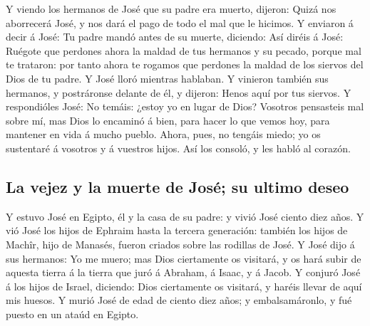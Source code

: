  Y viendo los hermanos de José que su padre era muerto,
dijeron: Quizá nos aborrecerá José, y nos dará el pago de todo el mal
que le hicimos.  Y enviaron á decir á José: Tu padre mandó
antes de su muerte, diciendo:  Así diréis á José: Ruégote
que perdones ahora la maldad de tus hermanos y su pecado, porque mal te
trataron: por tanto ahora te rogamos que perdones la maldad de los
siervos del Dios de tu padre. Y José lloró mientras hablaban.
 Y vinieron también sus hermanos, y postráronse delante de
él, y dijeron: Henos aquí por tus siervos.  Y respondióles
José: No temáis: ¿estoy yo en lugar de Dios?  Vosotros
pensasteis mal sobre mí, mas Dios lo encaminó á bien, para hacer lo que
vemos hoy, para mantener en vida á mucho pueblo.  Ahora,
pues, no tengáis miedo; yo os sustentaré á vosotros y á vuestros hijos.
Así los consoló, y les habló al corazón.

\hypertarget{la-vejez-y-la-muerte-de-josuxe9-su-ultimo-deseo}{%
\subsection{La vejez y la muerte de José; su ultimo
deseo}\label{la-vejez-y-la-muerte-de-josuxe9-su-ultimo-deseo}}

 Y estuvo José en Egipto, él y la casa de su padre: y vivió
José ciento diez años.  Y vió José los hijos de Ephraim
hasta la tercera generación: también los hijos de Machîr, hijo de
Manasés, fueron criados sobre las rodillas de José.  Y José
dijo á sus hermanos: Yo me muero; mas Dios ciertamente os visitará, y os
hará subir de aquesta tierra á la tierra que juró á Abraham, á Isaac, y
á Jacob.  Y conjuró José á los hijos de Israel, diciendo:
Dios ciertamente os visitará, y haréis llevar de aquí mis huesos.
 Y murió José de edad de ciento diez años; y
embalsamáronlo, y fué puesto en un ataúd en Egipto.
